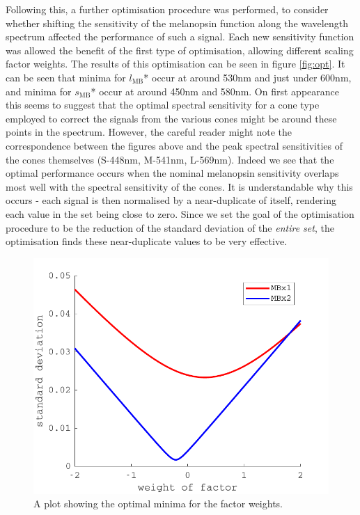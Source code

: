 Following this, a further optimisation procedure was performed, to consider whether shifting the sensitivity of the melanopsin function along the wavelength spectrum affected the performance of such a signal. Each new sensitivity function was allowed the benefit of the first type of optimisation, allowing different scaling factor weights. The results of this optimisation can be seen in figure \ref{fig:opt}. It can be seen that minima for $l_{\text{MB}}$* occur at around 530nm and just under 600nm, and minima for $s_{\text{MB}}$* occur at around 450nm and 580nm. On first appearance this seems to suggest that the optimal spectral sensitivity for a cone type employed to correct the signals from the various cones might be around these points in the spectrum. However, the careful reader might note the correspondence between the figures above and the peak spectral sensitivities of the cones themselves (S-448nm, M-541nm, L-569nm). Indeed we see that the optimal performance occurs when the nominal melanopsin sensitivity overlaps most well with the spectral sensitivity of the cones. It is understandable why this occurs - each signal is then normalised by a near-duplicate of itself, rendering each value in the set being close to zero. Since we set the goal of the optimisation procedure to be the reduction of the standard deviation of the \emph{entire set}, the optimisation finds these near-duplicate values to be very effective.

\begin{figure}[htbp]
    \includegraphics[max width=\textwidth]{figs/comp/melcomp_1/minimiseSD.pdf}
    \caption{A plot showing the optimal minima for the factor weights.}
    \label{fig:minSD}
\end{figure} 

